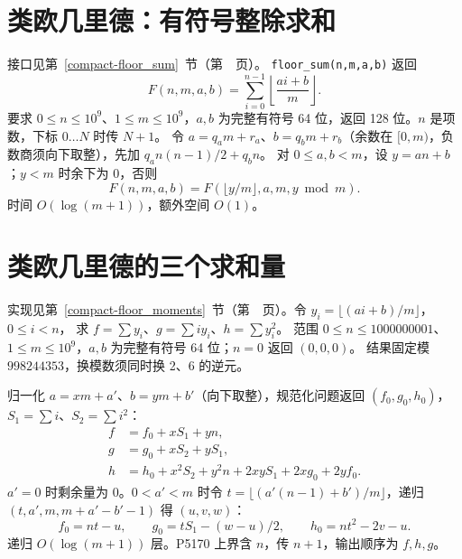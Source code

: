 \section{类欧几里德：有符号整除求和}\label{knowledge-floor-sum}
接口见第~\ref{compact-floor_sum}~节（第~\pageref{compact-floor_sum}~页）。
\texttt{floor\_sum(n,m,a,b)} 返回
\[
F(n,m,a,b)=\sum_{i=0}^{n-1}\left\lfloor\frac{ai+b}{m}\right\rfloor.
\]
要求 $0\le n\le10^9$、$1\le m\le10^9$，$a,b$ 为完整有符号 64 位，返回 128 位。$n$ 是项数，下标 $0\ldots N$ 时传 $N+1$。
令 $a=q_am+r_a$、$b=q_bm+r_b$（余数在 $[0,m)$，负数商须向下取整），先加 $q_an(n-1)/2+q_bn$。
对 $0\le a,b<m$，设 $y=an+b$；$y<m$ 时余下为 0，否则
\[
F(n,m,a,b)=F(\lfloor y/m\rfloor,a,m,y\bmod m).
\]
时间 $O(\log(m+1))$，额外空间 $O(1)$。

\section{类欧几里德的三个求和量}\label{knowledge-floor-moments}
实现见第~\ref{compact-floor_moments}~节（第~\pageref{compact-floor_moments}~页）。令 $y_i=\lfloor(ai+b)/m\rfloor$，$0\le i<n$，
求 $f=\sum y_i$、$g=\sum i y_i$、$h=\sum y_i^2$。
范围 $0\le n\le1000000001$、$1\le m\le10^9$，$a,b$ 为完整有符号 64 位；$n=0$ 返回 $(0,0,0)$。
结果固定模 $998244353$，换模数须同时换 2、6 的逆元。

归一化 $a=xm+a'$、$b=ym+b'$（向下取整），规范化问题返回 $(f_0,g_0,h_0)$，$S_1=\sum i$、$S_2=\sum i^2$：
\[
\begin{aligned}
f&=f_0+xS_1+yn,\\
g&=g_0+xS_2+yS_1,\\
h&=h_0+x^2S_2+y^2n+2xyS_1+2xg_0+2yf_0.
\end{aligned}
\]
$a'=0$ 时剩余量为 0。$0<a'<m$ 时令 $t=\lfloor(a'(n-1)+b')/m\rfloor$，递归 $(t,a',m,m+a'-b'-1)$ 得 $(u,v,w)$：
\[
f_0=nt-u,\qquad g_0=tS_1-(w-u)/2,\qquad h_0=nt^2-2v-u.
\]
递归 $O(\log(m+1))$ 层。P5170 上界含 $n$，传 $n+1$，输出顺序为 $f,h,g$。
